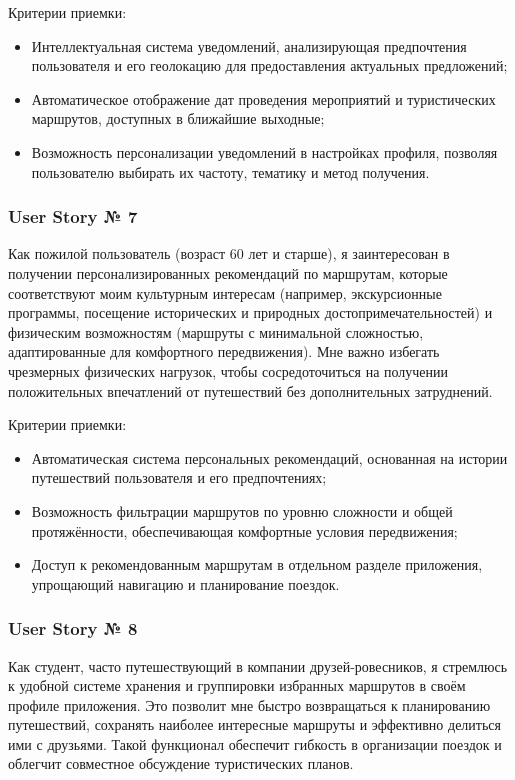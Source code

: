 Критерии приемки:
\begin{itemize}
    \item Интеллектуальная система уведомлений, анализирующая предпочтения пользователя и его геолокацию для предоставления актуальных предложений;
    \item Автоматическое отображение дат проведения мероприятий и туристических маршрутов, доступных в ближайшие выходные;
    \item Возможность персонализации уведомлений в настройках профиля, позволяя пользователю выбирать их частоту, тематику и метод получения.
\end{itemize}


\subsubsection*{User Story № 7} 
Как пожилой пользователь (возраст 60 лет и старше), я заинтересован в получении персонализированных рекомендаций по маршрутам, которые соответствуют моим культурным интересам (например, экскурсионные программы, посещение исторических и природных достопримечательностей) и физическим возможностям (маршруты с минимальной сложностью, адаптированные для комфортного передвижения). Мне важно избегать чрезмерных физических нагрузок, чтобы сосредоточиться на получении положительных впечатлений от путешествий без дополнительных затруднений.

Критерии приемки:
\begin{itemize}
    \item Автоматическая система персональных рекомендаций, основанная на истории путешествий пользователя и его предпочтениях;
    \item Возможность фильтрации маршрутов по уровню сложности и общей протяжённости, обеспечивающая комфортные условия передвижения;
    \item Доступ к рекомендованным маршрутам в отдельном разделе приложения, упрощающий навигацию и планирование поездок.
\end{itemize}


\subsubsection*{User Story № 8} 
Как студент, часто путешествующий в компании друзей-ровесников, я стремлюсь к удобной системе хранения и группировки избранных маршрутов в своём профиле приложения. Это позволит мне быстро возвращаться к планированию путешествий, сохранять наиболее интересные маршруты и эффективно делиться ими с друзьями. Такой функционал обеспечит гибкость в организации поездок и облегчит совместное обсуждение туристических планов.

